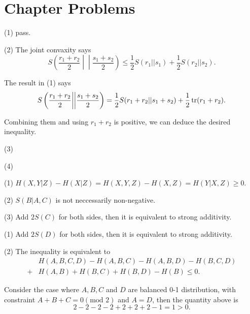\section*{Chapter Problems}

\prob \todo

\prob (1) pass.

(2) The joint convaxity says
$$
S\left(\frac{r_1+r_2}{2}\middle|\middle|\frac{s_1+s_2}{2}\right) \le \frac{1}{2}S(r_1||s_1) + \frac{1}{2}S(r_2||s_2).
$$

The result in (1) says
$$
S\left(\frac{r_1+r_2}{2}\middle|\middle|\frac{s_1+s_2}{2}\right) = \frac{1}{2}S(r_1+r_2||s_1+s_2) + \frac{1}{2}\operatorname{tr}(r_1+r_2).
$$

Combining them and using $r_1+r_2$ is positive, we can deduce the desired inequality.

(3) \todo

(4) \todo

\prob (1) $H(X,Y|Z)-H(X|Z)=H(X,Y,Z)-H(X,Z)=H(Y|X,Z)\ge 0$.

(2) $S(B|A,C)$ is not neccessarily non-negative.

(3) Add $2S(C)$ for both sides, then it is equivalent to strong additivity.

\prob (1) Add $2S(D)$ for both sides, then it is equivalent to strong additivity.

(2) The inequality is equivalent to
$$\begin{aligned}
&H(A,B,C,D)-H(A,B,C)-H(A,B,D)-H(B,C,D)
\\+&H(A,B)+H(B,C)+H(B,D)-H(B) \le 0.
\end{aligned}$$

Consider the case where $A,B,C$ and $D$ are balanced 0-1 distribution, with constraint $A+B+C=0(\text{mod }2)$ and $A=D$, then the quantity above is
$$
2-2-2-2+2+2+2-1=1>0.
$$

\prob \todo